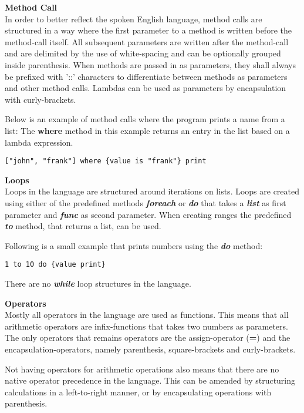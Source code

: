 \textbf{Method Call}\\
In order to better reflect the spoken English language, method calls are structured in a way where the first parameter to a method is written before the method-call itself.
All subsequent parameters are written after the method-call and are delimited by the use of white-spacing and can be optionally grouped inside parenthesis.
When methods are passed in as parameters, they shall always be prefixed with '::' characters to differentiate between methods as parameters and other method calls. 
Lambdas can be used as parameters by encapsulation with curly-brackets. 

Below is an example of method calls where the program prints a name from a list:
The \textbf{where} method in this example returns an entry in the list based on a lambda expression.
\begin{lstlisting}
["john", "frank"] where {value is "frank"} print
\end{lstlisting}

\textbf{Loops}\\
Loops in the language are structured around iterations on lists.
Loops are created using either of the predefined methods \textbf{\textit{foreach}} or \textbf{\textit{do}} that takes a \textbf{\textit{list}} as first parameter and \textbf{\textit{func}} as second parameter.
When creating ranges the predefined \textbf{\textit{to}} method, that returns a list, can be used. 

Following is a small example that prints numbers using the \textbf{\textit{do}} method:
\begin{lstlisting}
1 to 10 do {value print}
\end{lstlisting}
There are no \textbf{\textit{while}} loop structures in the language.

\textbf{Operators}\\
Mostly all operators in the language are used as functions.
This means that all arithmetic operators are infix-functions that takes two numbers as parameters. 
The only operators that remains operators are the assign-operator (\textbf{=}) and the encapsulation-operators, namely parenthesis, square-brackets and curly-brackets.

Not having operators for arithmetic operations also means that there are no native operator precedence in the language.
This can be amended by structuring calculations in a left-to-right manner, or by encapsulating operations with parenthesis. 
